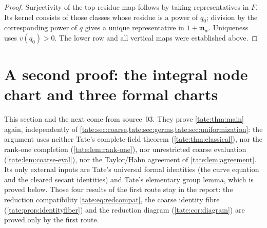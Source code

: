 \documentclass[11pt,letterpaper]{article}
\theoremstyle{definition}
\newcommand{\m}{\mathfrak m}
\begin{document}
\begin{proof}
Surjectivity of the top residue map follows by taking representatives
in $F$. Its kernel consists of those classes whose residue is a power
of $q_0$; division by the corresponding power of $q$ gives a unique
representative in $1+\m_w$. Uniqueness uses $v(q_0)>0$.
The lower row and all vertical maps were established above.
\end{proof}

\section{A second proof: the integral node chart and three formal charts}
\label{tate:node:sec:second}

This section and the next come from source~03. They prove
\cref{tate:thm:main} again, independently of
\cref{tate:sec:coarse,tate:sec:germs,tate:sec:uniformization}: the
argument uses neither Tate's complete-field theorem
(\cref{tate:thm:classical}), nor the rank-one completion
(\cref{tate:lem:rank-one}), nor unrestricted coarse evaluation
(\cref{tate:lem:coarse-eval}), nor the Taylor/Hahn agreement of
\cref{tate:lem:agreement}. Its only external inputs are Tate's universal
formal identities (the curve equation and the cleared secant identities)
and Tate's elementary group lemma, which is proved below. Those four
results of the first route stay in the report: the reduction compatibility
\eqref{tate:eq:redcompat}, the coarse identity fibre
(\cref{tate:prop:identityfiber}) and the reduction diagram
(\cref{tate:cor:diagram}) are proved only by the first route.
\end{document}
